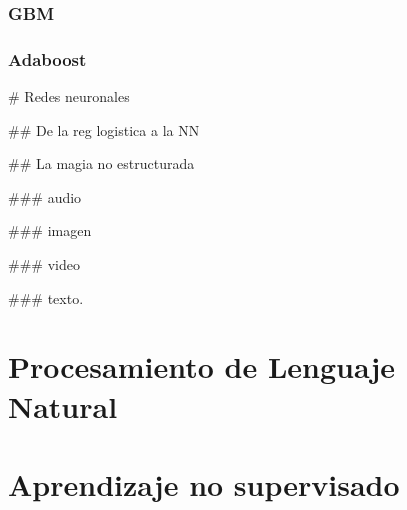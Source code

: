 \documentclass[]{book}
\begin{document}
\hypertarget{gbm}{%
\subsection{GBM}\label{gbm}}

\hypertarget{adaboost}{%
\subsection{Adaboost}\label{adaboost}}

\# Redes neuronales

\#\# De la reg logistica a la NN

\#\# La magia no estructurada

\#\#\# audio

\#\#\# imagen

\#\#\# video

\#\#\# texto.

\hypertarget{procesamiento-de-lenguaje-natural}{%
\chapter{Procesamiento de Lenguaje Natural}\label{procesamiento-de-lenguaje-natural}}

\hypertarget{aprendizaje-no-supervisado}{%
\chapter{Aprendizaje no supervisado}\label{aprendizaje-no-supervisado}}


\end{document}

